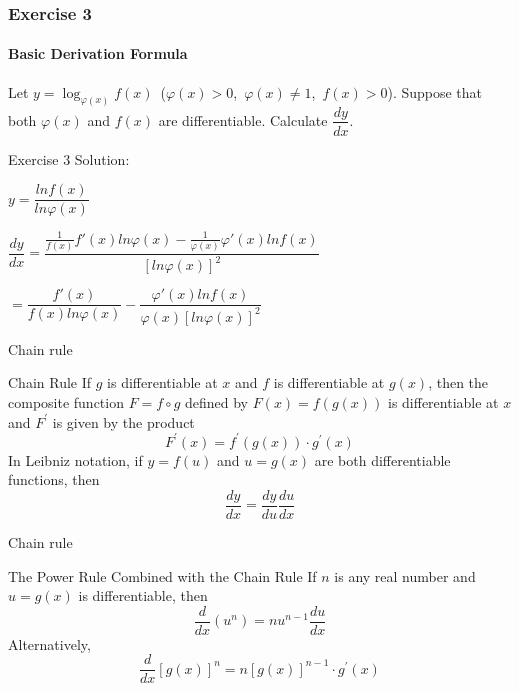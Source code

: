 

\begin{frame}
    \frametitle{Exercise 3}
    \framesubtitle{Basic Derivation Formula}
    Let $y = \log_{\varphi (x)}{f(x)}$\ ($\varphi (x) > 0$,\ $\varphi (x) \neq 1$,\ $f(x) > 0$). Suppose that both $\varphi (x)$ and $f(x)$ are differentiable. Calculate $\dfrac{dy}{dx}$.
\end{frame}



\begin{frame}{Exercise 3}
    Solution:

    $y = \dfrac{lnf(x)}{ln\varphi(x)}$

    $\dfrac{dy}{dx} = \dfrac{\frac{1}{f(x)}f'(x)ln\varphi(x) - \frac{1}{\varphi(x)}\varphi'(x)lnf(x)}{[ln\varphi(x)]^2}$

    $=\dfrac{f'(x)}{f(x)ln\varphi(x)} - \dfrac{\varphi'(x)lnf(x)}{\varphi(x)[ln\varphi(x)]^2}$

\end{frame}




\begin{frame}{Chain rule}
    \begin{block}{Chain Rule}
        If $g$ is differentiable at $x$ and $f$ is differentiable at $g(x)$, then the composite function $F=f \circ g$ defined by $F(x)=f(g(x))$ is differentiable at $x$ and $F^{\prime}$ is given by the product
        $$
            F^{\prime}(x)=f^{\prime}(g(x)) \cdot g^{\prime}(x)
        $$
        In Leibniz notation, if $y=f(u)$ and $u=g(x)$ are both differentiable functions, then
        $$
            \frac{d y}{d x}=\frac{d y}{d u} \frac{d u}{d x}
        $$
    \end{block}
\end{frame}



\begin{frame}{Chain rule}
    \begin{block}{The Power Rule Combined with the Chain Rule }
        If $n$ is any real number and $u=g(x)$ is differentiable, then
        $$
            \frac{d}{d x}\left(u^{n}\right)=n u^{n-1} \frac{d u}{d x}
        $$
        Alternatively,
        $$
            \frac{d}{d x}[g(x)]^{n}=n[g(x)]^{n-1} \cdot g^{\prime}(x)
        $$
    \end{block}
\end{frame}


